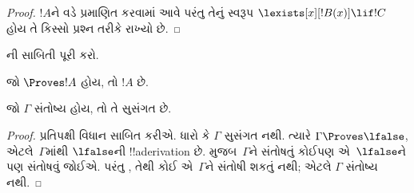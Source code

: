 \documentclass[../../../include/open-logic-section]{subfiles}
\begin{document}
\begin{proof}
{$!A$ને \QR{} વડે પ્રમાણિત કરવામાં આવે પરંતુ તેનું સ્વરૂપ
$\lexists[x][!B(x)] \lif !C$ હોય તે કિસ્સો પ્રશ્ન તરીકે રાખ્યો છે.}{}
\end{proof}


\begin{prob}
  ની સાબિતી પૂરી કરો.
\end{prob}
\tagendprob

\begin{cor}
જો $\Proves !A$ હોય, તો $!A$  છે.
\end{cor}

\begin{cor}
જો $\Gamma$ સંતોષ્ય હોય, તો તે સુસંગત છે.
\end{cor}

\begin{proof}
પ્રતિપક્ષી વિધાન સાબિત કરીએ. ધારો કે $\Gamma$ સુસંગત નથી. ત્યારે
$\Gamma \Proves \lfalse$, એટલે~$\Gamma$માંથી $\lfalse$ની
!!a{derivation} છે.  મુજબ~$\Gamma$ને સંતોષતું
કોઈપણ 
એ~$\lfalse$ને પણ સંતોષવું જોઈએ. પરંતુ
, તેથી કોઈ
 એ~$\Gamma$ને સંતોષી શકતું નથી;
એટલે $\Gamma$ સંતોષ્ય નથી.
\end{proof}
\end{document}
